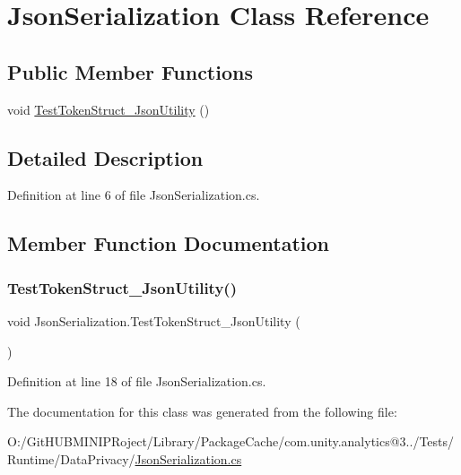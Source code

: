 \hypertarget{class_json_serialization}{}\section{Json\+Serialization Class Reference}
\label{class_json_serialization}
\subsection*{Public Member Functions}
\begin{DoxyCompactItemize}
\item 
void \mbox{\hyperlink{class_json_serialization_a5c58b694b1e0bb959f34a152d52239a3}{Test\+Token\+Struct\+\_\+\+Json\+Utility}} ()
\end{DoxyCompactItemize}


\subsection{Detailed Description}


Definition at line 6 of file Json\+Serialization.\+cs.



\subsection{Member Function Documentation}
\mbox{\label{class_json_serialization_a5c58b694b1e0bb959f34a152d52239a3}} 
\subsubsection{\texorpdfstring{TestTokenStruct\_JsonUtility()}{TestTokenStruct\_JsonUtility()}}
{\footnotesize\ttfamily void Json\+Serialization.\+Test\+Token\+Struct\+\_\+\+Json\+Utility (\begin{DoxyParamCaption}{ }\end{DoxyParamCaption})}



Definition at line 18 of file Json\+Serialization.\+cs.



The documentation for this class was generated from the following file\+:\begin{DoxyCompactItemize}
\item 
O\+:/\+Git\+H\+U\+B\+M\+I\+N\+I\+P\+Roject/\+Library/\+Package\+Cache/com.\+unity.\+analytics@3../\+Tests/\+Runtime/\+Data\+Privacy/\mbox{\hyperlink{_json_serialization_8cs}{Json\+Serialization.\+cs}}\end{DoxyCompactItemize}
